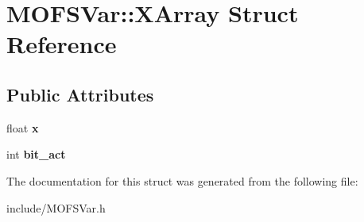 \hypertarget{structMOFSVar_1_1XArray}{\section{M\-O\-F\-S\-Var\-:\-:X\-Array Struct Reference}
\label{structMOFSVar_1_1XArray}
}
\subsection*{Public Attributes}
\begin{DoxyCompactItemize}
\item 
\hypertarget{structMOFSVar_1_1XArray_a496f909b0e72f64f360c4e4b4e863267}{float {\bfseries x}}\label{structMOFSVar_1_1XArray_a496f909b0e72f64f360c4e4b4e863267}

\item 
\hypertarget{structMOFSVar_1_1XArray_aafc6fc7a075692c0a04c83562c96e80f}{int {\bfseries bit\-\_\-act}}\label{structMOFSVar_1_1XArray_aafc6fc7a075692c0a04c83562c96e80f}

\end{DoxyCompactItemize}


The documentation for this struct was generated from the following file\-:\begin{DoxyCompactItemize}
\item 
include/M\-O\-F\-S\-Var.\-h\end{DoxyCompactItemize}
